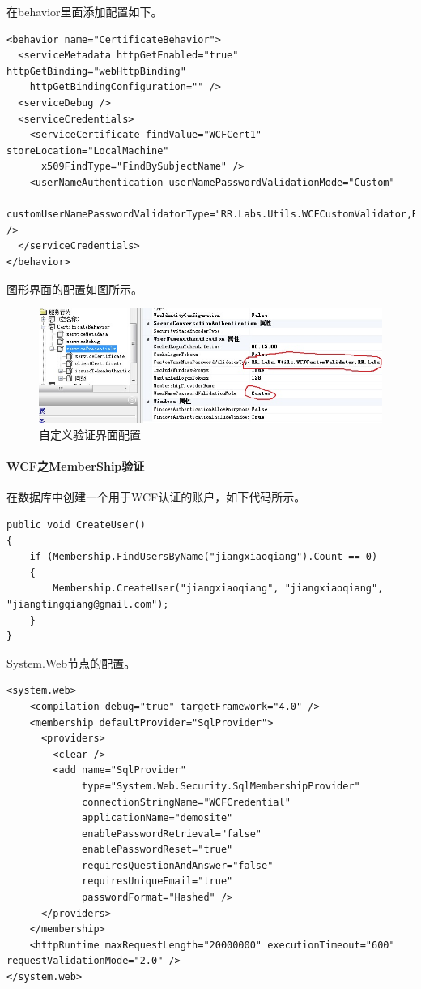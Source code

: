 \documentclass{book}
\begin{document}
在behavior里面添加配置如下。

\begin{lstlisting}
<behavior name="CertificateBehavior">
  <serviceMetadata httpGetEnabled="true" httpGetBinding="webHttpBinding"
    httpGetBindingConfiguration="" />
  <serviceDebug />
  <serviceCredentials>
    <serviceCertificate findValue="WCFCert1" storeLocation="LocalMachine"
      x509FindType="FindBySubjectName" />
    <userNameAuthentication userNamePasswordValidationMode="Custom"
      customUserNamePasswordValidatorType="RR.Labs.Utils.WCFCustomValidator,RR.Labs" />
  </serviceCredentials>
</behavior>
\end{lstlisting}

图形界面的配置如图所示。

\begin{figure}[htbp]
	\centering
	\includegraphics[scale=0.8]{CustomValidateServerConfig.jpg}
	\caption{自定义验证界面配置}
	\label{fig:CustomValidateServerConfig}
\end{figure}

\paragraph{WCF之MemberShip验证}

在数据库中创建一个用于WCF认证的账户，如下代码所示。

\begin{lstlisting}[language={[Sharp]C},caption=MemberShip创建用户]
public void CreateUser()
{
    if (Membership.FindUsersByName("jiangxiaoqiang").Count == 0)
    {
        Membership.CreateUser("jiangxiaoqiang", "jiangxiaoqiang", "jiangtingqiang@gmail.com");
    }
}
\end{lstlisting}

System.Web节点的配置。

\begin{lstlisting}
<system.web>
	<compilation debug="true" targetFramework="4.0" />
	<membership defaultProvider="SqlProvider">
	  <providers>
	    <clear />
	    <add name="SqlProvider"
	         type="System.Web.Security.SqlMembershipProvider"
	         connectionStringName="WCFCredential"
	         applicationName="demosite"
	         enablePasswordRetrieval="false"
	         enablePasswordReset="true"
	         requiresQuestionAndAnswer="false"
	         requiresUniqueEmail="true"      
	         passwordFormat="Hashed" />
	  </providers>
	</membership>
	<httpRuntime maxRequestLength="20000000" executionTimeout="600" requestValidationMode="2.0" />
</system.web>
\end{lstlisting}
\end{document}
